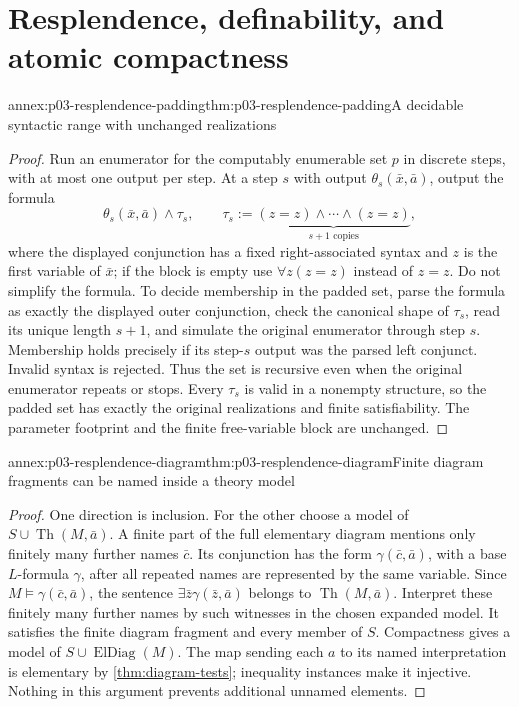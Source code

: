 \section{Resplendence, definability, and atomic compactness}

\begin{annexitem}{annex:p03-resplendence-padding}{thm:p03-resplendence-padding}{A decidable syntactic range with unchanged realizations}
\begin{proof}
Run an enumerator for the computably enumerable set \(p\) in discrete
steps, with at most one output per step. At a step \(s\) with output
\(\theta_s(\bar x,\bar a)\), output the formula
\[
 \theta_s(\bar x,\bar a)\land\tau_s,
 \qquad \tau_s:=\underbrace{(z=z)\land\cdots\land(z=z)}_{s+1\text{ copies}},
\]
where the displayed conjunction has a fixed right-associated syntax and
\(z\) is the first variable of \(\bar x\); if the block is empty use
\(\forall z(z=z)\) instead of \(z=z\). Do not simplify the formula.
To decide membership in the padded set, parse the formula as exactly the
displayed outer conjunction, check the canonical shape of \(\tau_s\),
read its unique length \(s+1\), and simulate the original enumerator
through step \(s\). Membership holds precisely if its step-\(s\)
output was the parsed left conjunct. Invalid syntax is rejected. Thus the
set is recursive even when the original enumerator repeats or stops.
Every \(\tau_s\) is valid in a nonempty structure, so the padded set
has exactly the original realizations and finite satisfiability. The
parameter footprint and the finite free-variable block are unchanged.
\end{proof}
\end{annexitem}

\begin{annexitem}{annex:p03-resplendence-diagram}{thm:p03-resplendence-diagram}{Finite diagram fragments can be named inside a theory model}
\begin{proof}
One direction is inclusion. For the other choose a model of
\(S\cup\operatorname{Th}(M,\bar a)\). A finite part of the full
elementary diagram mentions only finitely many further names \(\bar c\).
Its conjunction has the form \(\gamma(\bar c,\bar a)\), with a base
\(L\)-formula \(\gamma\), after all repeated names are represented by
the same variable. Since \(M\models\gamma(\bar c,\bar a)\), the
sentence \(\exists\bar z\gamma(\bar z,\bar a)\) belongs to
\(\operatorname{Th}(M,\bar a)\). Interpret these finitely many further
names by such witnesses in the chosen expanded model. It satisfies the
finite diagram fragment and every member of \(S\). Compactness gives
a model of \(S\cup\operatorname{ElDiag}(M)\). The map sending each
\(a\) to its named interpretation is elementary by
\cref{thm:diagram-tests}; inequality instances make it injective. Nothing
in this argument prevents additional unnamed elements.
\end{proof}
\end{annexitem}

